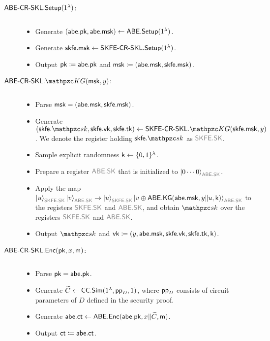 \begin{description}
\item[$\mathsf{ABE}\textrm{-}\mathsf{CR}\textrm{-}\mathsf{SKL}.\mathsf{Setup}(1^\lambda)$:] $ $
\begin{itemize}
    \item Generate $(\mathsf{abe}.\mathsf{pk},\mathsf{abe}.\mathsf{msk})\leftarrow\mathsf{ABE}.\mathsf{Setup}(1^\lambda)$.
    \item Generate $\mathsf{skfe}.\mathsf{msk}\leftarrow\mathsf{SKFE}\textrm{-}\mathsf{CR}\textrm{-}\mathsf{SKL}.\mathsf{Setup}(1^\lambda)$.
    \item Output $\mathsf{pk}\coloneqq\mathsf{abe}.\mathsf{pk}$ and $\mathsf{msk}\coloneqq(\mathsf{abe}.\mathsf{msk},\mathsf{skfe}.\mathsf{msk})$.
\end{itemize}



\item[$\ABESKL.\qKG(\msk,y)$:] $ $
\begin{itemize}
    \item Parse $\mathsf{msk}=(\mathsf{abe}.\mathsf{msk},\mathsf{skfe}.\mathsf{msk})$.
    \item Generate $(\skfe.\qsk,\skfe.\vk,\skfe.\tk)\gets\SKFESKL.\qKG(\skfe.\msk,y)$. We denote the register holding $\skfe.\qsk$ as $\qreg{SKFE.SK}$.
    \item Sample explicit randomness $\mathsf{k} \leftarrow \{0,1\}^\lambda$.
    \item Prepare a register $\qreg{ABE.SK}$ that is initialized to $\ket{0\cdots0}_{\qreg{ABE.SK}}$.
    \item Apply the map
        $\ket{u}_{\qreg{SKFE.SK}}\ket{v}_{\qreg{ABE.SK}}\ra\ket{u}_{\qreg{SKFE.SK}}\ket{v\oplus\ABE.\KG(\abe.\msk,y\|u,\key)}_{\qreg{ABE.SK}}$ to the registers $\qreg{SKFE.SK}$ and $\qreg{ABE.SK}$, and obtain $\qsk$ over the registers $\qreg{SKFE.SK}$ and $\qreg{ABE.SK}$.
    \item Output $\qsk$ and
        $\mathsf{vk}\coloneqq(y,\mathsf{abe}.\mathsf{msk},\mathsf{skfe}.\mathsf{vk},\mathsf{skfe}.\mathsf{tk}, \mathsf{k})$.
\end{itemize}



\item[$\mathsf{ABE}\textrm{-}\mathsf{CR}\textrm{-}\mathsf{SKL}.\mathsf{Enc}(\mathsf{pk},x,\mathsf{m})$:] $ $
\begin{itemize}
    \item Parse $\mathsf{pk}=\mathsf{abe}.\mathsf{pk}$.
\item Generate $\widetilde{C}\leftarrow\mathsf{CC}.\mathsf{Sim}(1^\lambda,\mathsf{pp}_D,1)$, where $\mathsf{pp}_D$ consists of circuit parameters of $D$ defined in the security proof.
    \item Generate $\mathsf{abe}.\mathsf{ct}\leftarrow\mathsf{ABE}.\mathsf{Enc}(\mathsf{abe}.\mathsf{pk},x\|\widetilde{C},\mathsf{m})$.
    \item Output $\mathsf{ct}\coloneqq\mathsf{abe}.\mathsf{ct}$.
\end{itemize}
 

\end{description}
